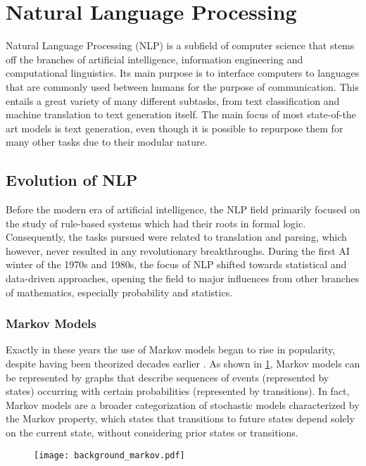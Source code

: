 \section{Natural Language Processing}

Natural Language Processing (NLP) is a subfield of computer science that stems off the branches of artificial intelligence, information engineering and computational linguistics.
Its main purpose is to interface computers to languages that are commonly used between humans for the purpose of communication.
This entails a great variety of many different subtasks, from text classification and machine translation to text generation itself.
The main focus of most state-of-the art models is text generation, even though it is possible to repurpose them for many other tasks due to their modular nature.

\subsection{Evolution of NLP}

Before the modern era of artificial intelligence, the NLP field primarily focused on the study of rule-based systems which had their roots in formal logic.
Consequently, the tasks pursued were related to translation and parsing, which however, never resulted in any revolutionary breakthroughs.
During the first AI winter of the 1970s and 1980s, the focus of NLP shifted towards statistical and data-driven approaches, opening the field to major influences from other branches of mathematics, especially probability and statistics.

\subsubsection*{Markov Models}

Exactly in these years the use of Markov models began to rise in popularity, despite having been theorized decades earlier .
As shown in \cref{fig:background_markov}, Markov models can be represented by graphs that describe sequences of events (represented by states) occurring with certain probabilities (represented by transitions). 
In fact, Markov models are a broader categorization of stochastic models characterized by the Markov property, which states that transitions to future states depend solely on the current state, without considering prior states or transitions.

\begin{figure}[t!]
    \centering
    \texttt{[image: background\_markov.pdf]}
    \caption{}
    \label{fig:background_markov}
\end{figure}

